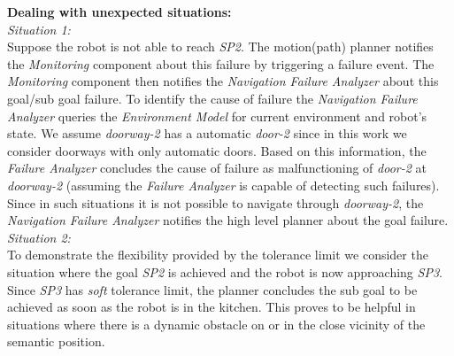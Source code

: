 \textbf{Dealing with unexpected situations:}\\
\textit{Situation 1:}\\
Suppose the robot is not able to reach \textit{SP2}.
The motion(path) planner notifies the \textit{Monitoring} component about this failure by triggering a failure event.
The \textit{Monitoring} component then notifies the \textit{Navigation Failure Analyzer} about this goal/sub goal failure.
To identify the cause of failure the \textit{Navigation Failure Analyzer} queries the \textit{Environment Model} for current environment and robot's state.
We assume \textit{doorway-2} has a automatic \textit{door-2} since in this work we consider doorways with only automatic doors.
Based on this information, the \textit{Failure Analyzer}  concludes the cause of failure as malfunctioning of \textit{door-2} at \textit{doorway-2} (assuming the \textit{Failure Analyzer} is capable of detecting such failures).
Since in such situations it is not possible to navigate through \textit{doorway-2}, the \textit{Navigation Failure Analyzer}
notifies the high level planner about the goal failure.\\

\textit{Situation 2:}\\
To demonstrate the flexibility provided by the tolerance limit we consider the situation where the goal \textit{SP2} is achieved and the robot is now approaching \textit{SP3}.
Since \textit{SP3} has \textit{soft} tolerance limit, the planner concludes the sub goal to be achieved as soon as the robot is in the kitchen.
This proves to be helpful in situations where there is a dynamic obstacle on or in the close vicinity of the semantic position.

